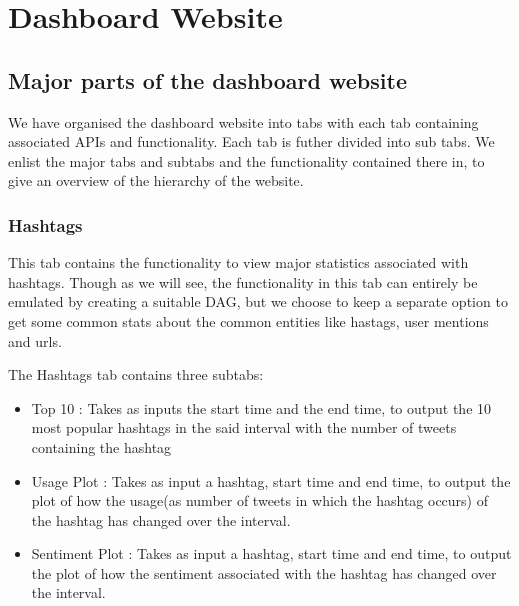 \documentclass[letterpaper,10pt,english]{sphinxmanual}
\begin{document}
\chapter{Dashboard Website}
\label{\detokenize{dashboard_website:dashboard-website}}\label{\detokenize{dashboard_website::doc}}

\section{Major parts of the dashboard website}
\label{\detokenize{dashboard_website:major-parts-of-the-dashboard-website}}
We have organised the dashboard website into tabs with each tab containing associated APIs and functionality. Each tab is futher divided into sub tabs. We enlist the major tabs and subtabs and the functionality contained there in, to give an overview of the hierarchy of the website.


\subsection{Hashtags}
\label{\detokenize{dashboard_website:hashtags}}
This tab contains the functionality to view major statistics associated with hashtags. Though as we will see, the functionality in this tab can entirely be emulated by creating a suitable DAG, but we choose to keep a separate option to get some common stats about the common entities like hastags, user mentions and urls.

The Hashtags tab contains three subtabs:
\begin{itemize}
\item {} 
Top 10 : Takes as inputs the start time and the end time, to output the 10 most popular hashtags in the said interval with the number of tweets containing the hashtag

\item {} 
Usage Plot : Takes as input a hashtag, start time and end time, to output the plot of how the usage(as number of tweets in which the hashtag occurs) of the hashtag has changed over the interval.

\item {} 
Sentiment Plot : Takes as input a hashtag, start time and end time, to output the plot of how the sentiment associated with the hashtag has changed over the interval.

\end{itemize}
\end{document}
